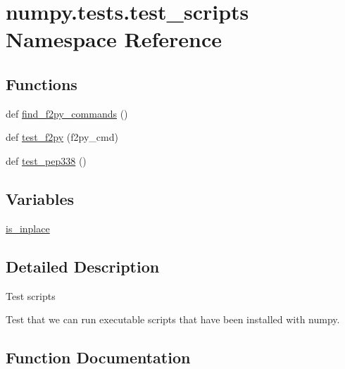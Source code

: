 \hypertarget{namespacenumpy_1_1tests_1_1test__scripts}{}\section{numpy.\+tests.\+test\+\_\+scripts Namespace Reference}
\label{namespacenumpy_1_1tests_1_1test__scripts}
\subsection*{Functions}
\begin{DoxyCompactItemize}
\item 
def \hyperlink{namespacenumpy_1_1tests_1_1test__scripts_a0115799226abfb724bea8be6e6165105}{find\+\_\+f2py\+\_\+commands} ()
\item 
def \hyperlink{namespacenumpy_1_1tests_1_1test__scripts_a7826135b271c64633adb07733a7eb0b4}{test\+\_\+f2py} (f2py\+\_\+cmd)
\item 
def \hyperlink{namespacenumpy_1_1tests_1_1test__scripts_abe8917fed6b7cb4d811de4be133a8b52}{test\+\_\+pep338} ()
\end{DoxyCompactItemize}
\subsection*{Variables}
\begin{DoxyCompactItemize}
\item 
\hyperlink{namespacenumpy_1_1tests_1_1test__scripts_a281ddd8fc3cd32edec733951ba65fc68}{is\+\_\+inplace}
\end{DoxyCompactItemize}


\subsection{Detailed Description}
\begin{DoxyVerb}Test scripts

Test that we can run executable scripts that have been installed with numpy.
\end{DoxyVerb}
 

\subsection{Function Documentation}
\mbox{\label{namespacenumpy_1_1tests_1_1test__scripts_a0115799226abfb724bea8be6e6165105}} 
